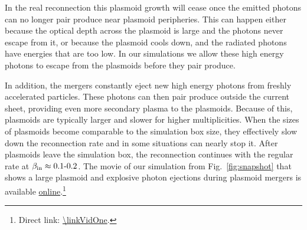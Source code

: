 In the real reconnection this plasmoid growth will cease once the emitted photons can no longer pair produce near plasmoid peripheries. This can happen either because the optical depth across the plasmoid is large and the photons never escape from it, or because the plasmoid cools down, and the radiated photons have energies that are too low. In our simulations we allow these high energy photons to escape from the plasmoids before they pair produce.

In addition, the mergers constantly eject new high energy photons from freshly accelerated particles. These photons can then pair produce outside the current sheet, providing even more secondary plasma to the plasmoids. Because of this, plasmoids are typically larger and slower for higher multiplicities. When the sizes of plasmoids become comparable to the simulation box size, they effectively slow down the reconnection rate and in some situations can nearly stop it. After plasmoids leave the simulation box, the reconnection continues with the regular rate at $\beta_{\rm in}\approx 0.1\text{-}0.2$. The movie of our simulation from Fig.~\ref{fig:snapshot} that shows a large plasmoid and explosive photon ejections during plasmoid mergers is available \href{\linkVidOne}{online}.\footnote{Direct link: \url{\linkVidOne}.}


